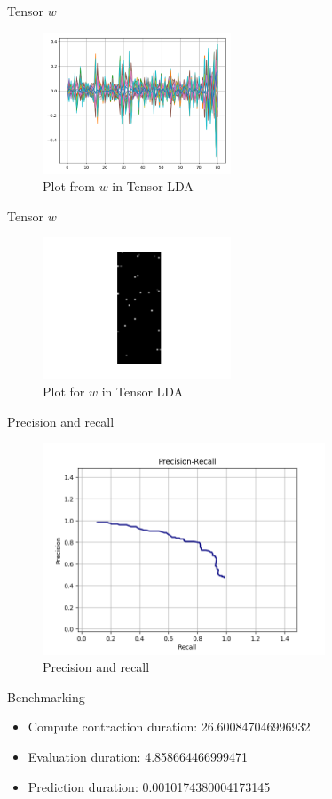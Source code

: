 \documentclass[handout]{beamer}
\begin{document}
\begin{frame}{Tensor $w$}
    {\centering
    \begin{figure}[H]
        \includegraphics[width=0.50\textwidth]{project_03/tensor_W.png}
        \caption{Plot from $w$ in Tensor LDA}
    \end{figure}
    }
\end{frame}

\begin{frame}{Tensor $w$}
    {\centering
    \begin{figure}[H]
        \includegraphics[width=0.50\textwidth]{project_03/WUnique.png}
        \caption{Plot for $w$ in Tensor LDA}
    \end{figure}
    }
\end{frame}

\begin{frame}{Precision and recall}
    {\centering
    \begin{figure}[H]
        \includegraphics[width=0.75\textwidth]{project_03/tensor_precision_recall.png}
        \caption{Precision and recall}
    \end{figure}
    }
\end{frame}

\begin{frame}{Benchmarking}
    \begin{itemize}
        \item Compute contraction duration: 26.600847046996932
        \item Evaluation duration: 4.858664466999471
        \item Prediction duration: 0.0010174380004173145
    \end{itemize}
\end{frame}
\note{}
\end{document}
